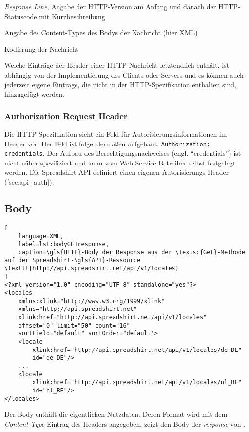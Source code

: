 \begin{compactitem}
    \item[\ding{202}] \emph{Response Line}, Angabe der \gls{HTTP}-Version am Anfang und danach der \gls{HTTP}-Statuscode mit Kurzbeschreibung
    \item[\ding{203}] Angabe des Content-Types des Bodys der Nachricht (hier \gls{XML})
    \item[\ding{204}] Kodierung der Nachricht
\end{compactitem}

Welche Einträge der Header einer \gls{HTTP}-Nachricht letztendlich enthält, ist abhängig von der Implementierung des Clients oder Servers und es können auch jederzeit eigene Einträge, die nicht in der \gls{HTTP}-Spezifikation enthalten sind, hinzugefügt werden.

\subsubsection{Authorization Request Header}
\label{sec:http-authorization-header}

Die \gls{HTTP}-Spezifikation \cite[][Abschnitt 14]{rfc2616} sieht ein Feld für Autorisierungsinformationen im Header vor. 
Der Feld ist folgendermaßen aufgebaut: \texttt{Authorization: credentials}. Der Aufbau des Berechtigungsnachweises (engl. \enquote {credentials}) ist nicht näher spezifiziert und kann vom Web Service Betreiber selbst festgelegt werden. Die Spreadshirt-\gls{API} definiert einen eigenen Autorisierungs-Header (\cref{sec:api_auth}).

\subsection{Body}
\label{sec:http-body}

\begin{minipage}{\textwidth}
\begin{lstlisting}[
    language=XML,
    label=lst:bodyGETresponse,
    caption=\gls{HTTP}-Body der Response aus der \textsc{Get}-Methode auf der Spreadshirt-\gls{API}-Ressource \texttt{http://api.spreadshirt.net/api/v1/locales}
]
<?xml version="1.0" encoding="UTF-8" standalone="yes"?>
<locales 
    xmlns:xlink="http://www.w3.org/1999/xlink" 
    xmlns="http://api.spreadshirt.net" 
    xlink:href="http://api.spreadshirt.net/api/v1/locales" 
    offset="0" limit="50" count="16" 
    sortField="default" sortOrder="default">
    <locale 
        xlink:href="http://api.spreadshirt.net/api/v1/locales/de_DE" 
        id="de_DE"/>
    ...
    <locale 
        xlink:href="http://api.spreadshirt.net/api/v1/locales/nl_BE" 
        id="nl_BE"/>
</locales>
\end{lstlisting}
\end{minipage}

Der Body enthält die eigentlichen Nutzdaten. Deren Format wird mit dem \emph{Content-Type}-Eintrag des Headers angegeben.  zeigt den Body der \emph{response} von .
